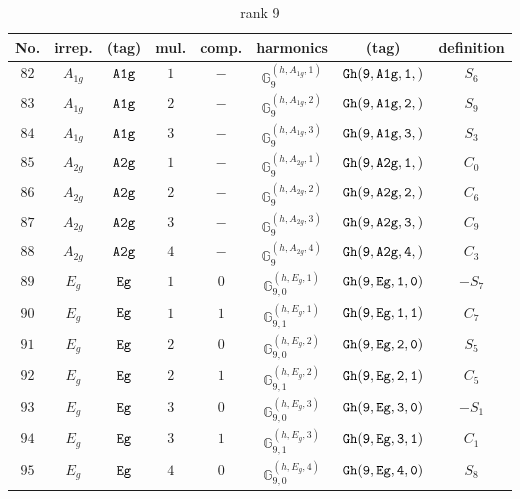 \documentclass[fleqn,8pt]{jsarticle}
\begin{document}
\begin{table}[ht!]
\begin{center}
\caption{rank 9}
\renewcommand{\arraystretch}{1.3}
\begin{tabular}{cccccccc} \hline \hline
No. & irrep. & (tag) & mul. & comp. & harmonics & (tag) & definition \\ \hline
$ 82 $ & $ A_{1g} $ & $ {\tt A1g} $ & $ 1 $ & $ - $ & $ \mathbb{G}_{9}^{(h,A_{1g},1)} $ & $ {\tt Gh(9,A1g,1,)} $ & $ S_{6} $ \\
$ 83 $ & $ A_{1g} $ & $ {\tt A1g} $ & $ 2 $ & $ - $ & $ \mathbb{G}_{9}^{(h,A_{1g},2)} $ & $ {\tt Gh(9,A1g,2,)} $ & $ S_{9} $ \\
$ 84 $ & $ A_{1g} $ & $ {\tt A1g} $ & $ 3 $ & $ - $ & $ \mathbb{G}_{9}^{(h,A_{1g},3)} $ & $ {\tt Gh(9,A1g,3,)} $ & $ S_{3} $ \\
$ 85 $ & $ A_{2g} $ & $ {\tt A2g} $ & $ 1 $ & $ - $ & $ \mathbb{G}_{9}^{(h,A_{2g},1)} $ & $ {\tt Gh(9,A2g,1,)} $ & $ C_{0} $ \\
$ 86 $ & $ A_{2g} $ & $ {\tt A2g} $ & $ 2 $ & $ - $ & $ \mathbb{G}_{9}^{(h,A_{2g},2)} $ & $ {\tt Gh(9,A2g,2,)} $ & $ C_{6} $ \\
$ 87 $ & $ A_{2g} $ & $ {\tt A2g} $ & $ 3 $ & $ - $ & $ \mathbb{G}_{9}^{(h,A_{2g},3)} $ & $ {\tt Gh(9,A2g,3,)} $ & $ C_{9} $ \\
$ 88 $ & $ A_{2g} $ & $ {\tt A2g} $ & $ 4 $ & $ - $ & $ \mathbb{G}_{9}^{(h,A_{2g},4)} $ & $ {\tt Gh(9,A2g,4,)} $ & $ C_{3} $ \\
$ 89 $ & $ E_{g} $ & $ {\tt Eg} $ & $ 1 $ & $ 0 $ & $ \mathbb{G}_{9,0}^{(h,E_{g},1)} $ & $ {\tt Gh(9,Eg,1,0)} $ & $ - S_{7} $ \\
$ 90 $ & $ E_{g} $ & $ {\tt Eg} $ & $ 1 $ & $ 1 $ & $ \mathbb{G}_{9,1}^{(h,E_{g},1)} $ & $ {\tt Gh(9,Eg,1,1)} $ & $ C_{7} $ \\
$ 91 $ & $ E_{g} $ & $ {\tt Eg} $ & $ 2 $ & $ 0 $ & $ \mathbb{G}_{9,0}^{(h,E_{g},2)} $ & $ {\tt Gh(9,Eg,2,0)} $ & $ S_{5} $ \\
$ 92 $ & $ E_{g} $ & $ {\tt Eg} $ & $ 2 $ & $ 1 $ & $ \mathbb{G}_{9,1}^{(h,E_{g},2)} $ & $ {\tt Gh(9,Eg,2,1)} $ & $ C_{5} $ \\
$ 93 $ & $ E_{g} $ & $ {\tt Eg} $ & $ 3 $ & $ 0 $ & $ \mathbb{G}_{9,0}^{(h,E_{g},3)} $ & $ {\tt Gh(9,Eg,3,0)} $ & $ - S_{1} $ \\
$ 94 $ & $ E_{g} $ & $ {\tt Eg} $ & $ 3 $ & $ 1 $ & $ \mathbb{G}_{9,1}^{(h,E_{g},3)} $ & $ {\tt Gh(9,Eg,3,1)} $ & $ C_{1} $ \\
$ 95 $ & $ E_{g} $ & $ {\tt Eg} $ & $ 4 $ & $ 0 $ & $ \mathbb{G}_{9,0}^{(h,E_{g},4)} $ & $ {\tt Gh(9,Eg,4,0)} $ & $ S_{8} $ \\

\end{tabular}
\end{center}
\end{table}
\end{document}

